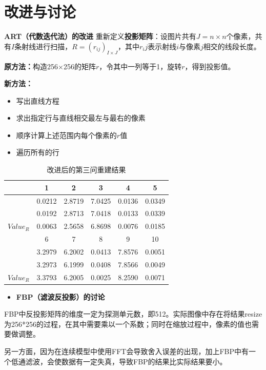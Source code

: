 \documentclass{beamer} %
\begin{document}
\section{改进与讨论}

\begin{frame}{\textbf{ART（代数迭代法）的改进}}
	重新定义\textbf{投影矩阵}：设图片共有\(J = n\times n\)个像素，共有$I$条射线进行扫描，$R=(r_{ij})_{I\times J}$，其中$r_ij$表示射线$i$与像素$j$相交的线段长度。

	\textbf{原方法：}构造256$\times$256的矩阵$r$，令其中一列等于1，旋转$r$，得到投影值。

	\textbf{新方法：}
	\begin{itemize}
		\item 写出直线方程
		\item 求出指定行与直线相交最左与最右的像素
		\item 顺序计算上述范围内每个像素的$r$值
		\item 遍历所有的行
	\end{itemize}
\end{frame}

\begin{frame}
	\begin{table}[H]
		\caption{改进后的第三问重建结果}
		\centering
		\begin{tabular}{cccccc}
			\toprule
			\text{No.}   & 1 & 2 & 3 & 4 & 5  \\
			\midrule
			\text{$Value$} & 0.0212 & 2.8719 & 7.0425 & 0.0136 & 0.0349 \\
			\text{$Value_F$} & 0.0192 & 2.8713 & 7.0418 & 0.0133 & 0.0339  \\
			$Value_R$ & 0.0063 & 2.5658 & 6.8698 & 0.0076 & 0.0185  \\
			\midrule
			\text{No.}   & 6 & 7 & 8 & 9 & 10 \\
			\midrule
			\text{$Value$}  & 3.2979 & 6.2002 & 0.0413 & 7.8576 & 0.0051 \\
			\text{$Value_F$} & 3.2973 & 6.1999 & 0.0408 & 7.8566 & 0.0049 \\
			$Value_R$  & 3.3793 & 6.2005 & 0.0025 & 8.2590 & 0.0071 \\
			\bottomrule
		\end{tabular}
	\end{table}
\end{frame}

\begin{frame}
	\begin{itemize}
		\item \textbf{FBP（滤波反投影）的讨论}
	\end{itemize}

	FBP中反投影矩阵的维度一定为探测单元数，即512。实际图像中存在将结果resize为256*256的过程，在其中需要乘以一个系数；同时在缩放过程中，像素的值也需要做调整。

	另一方面，因为在连续模型中使用FFT会导致舍入误差的出现，加上FBP中有一个低通滤波，会使数据有一定失真，导致FBP的结果比实际结果要小。
\end{frame}
\end{document}
